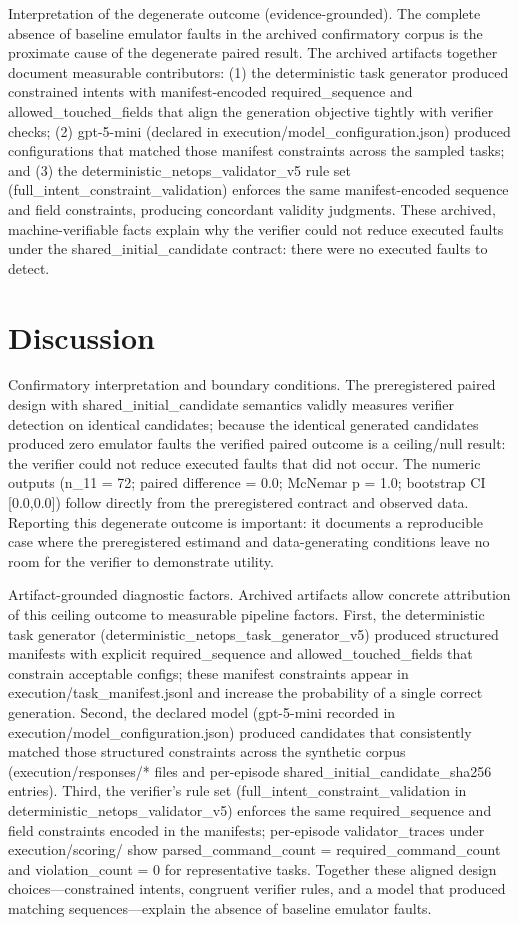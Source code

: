 \documentclass[conference]{IEEEtran}
\begin{document}
Interpretation of the degenerate outcome (evidence-grounded). The complete absence of baseline emulator faults in the archived confirmatory corpus is the proximate cause of the degenerate paired result. The archived artifacts together document measurable contributors: (1) the deterministic task generator produced constrained intents with manifest-encoded required\_sequence and allowed\_touched\_fields that align the generation objective tightly with verifier checks; (2) gpt-5-mini (declared in execution/model\_configuration.json) produced configurations that matched those manifest constraints across the sampled tasks; and (3) the deterministic\_netops\_validator\_v5 rule set (full\_intent\_constraint\_validation) enforces the same manifest-encoded sequence and field constraints, producing concordant validity judgments. These archived, machine-verifiable facts explain why the verifier could not reduce executed faults under the shared\_initial\_candidate contract: there were no executed faults to detect.

\section{Discussion}
Confirmatory interpretation and boundary conditions. The preregistered paired design with shared\_initial\_candidate semantics validly measures verifier detection on identical candidates; because the identical generated candidates produced zero emulator faults the verified paired outcome is a ceiling/null result: the verifier could not reduce executed faults that did not occur. The numeric outputs (n\_11 = 72; paired difference = 0.0; McNemar p = 1.0; bootstrap CI [0.0,0.0]) follow directly from the preregistered contract and observed data. Reporting this degenerate outcome is important: it documents a reproducible case where the preregistered estimand and data-generating conditions leave no room for the verifier to demonstrate utility.

Artifact-grounded diagnostic factors. Archived artifacts allow concrete attribution of this ceiling outcome to measurable pipeline factors. First, the deterministic task generator (deterministic\_netops\_task\_generator\_v5) produced structured manifests with explicit required\_sequence and allowed\_touched\_fields that constrain acceptable configs; these manifest constraints appear in execution/task\_manifest.jsonl and increase the probability of a single correct generation. Second, the declared model (gpt-5-mini recorded in execution/model\_configuration.json) produced candidates that consistently matched those structured constraints across the synthetic corpus (execution/responses/* files and per-episode shared\_initial\_candidate\_sha256 entries). Third, the verifier's rule set (full\_intent\_constraint\_validation in deterministic\_netops\_validator\_v5) enforces the same required\_sequence and field constraints encoded in the manifests; per-episode validator\_traces under execution/scoring/ show parsed\_command\_count = required\_command\_count and violation\_count = 0 for representative tasks. Together these aligned design choices---constrained intents, congruent verifier rules, and a model that produced matching sequences---explain the absence of baseline emulator faults.
\end{document}
